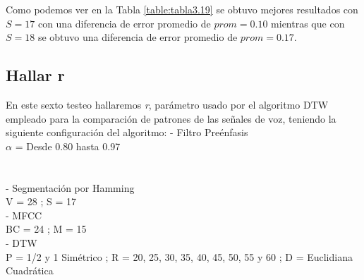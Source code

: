 Como podemos ver en la Tabla \ref{table:tabla3.19} se obtuvo mejores resultados con $S = 17$ con una diferencia de error promedio de $prom = 0.10$ mientras que con $S = 18$ se obtuvo una diferencia de error promedio de $prom = 0.17$.

\subsection{Hallar r}
En este sexto testeo hallaremos \textit{r}, parámetro usado por el algoritmo DTW empleado para la comparación de patrones de las señales de voz, teniendo la siguiente configuración del algoritmo:
\newpage
- Filtro Preénfasis \\
\hspace*{1cm} $\alpha$ = Desde 0.80 hasta 0.97 \\ \\ \\
- Segmentación por Hamming \\
\hspace*{1cm} V = 28 ; \qquad S = 17 \\
- MFCC \\
\hspace*{1cm} BC = 24 ; \qquad M = 15 \\
- DTW \\
\hspace*{1cm} P = 1/2 y 1 Simétrico ; R = 20, 25, 30, 35, 40, 45, 50, 55 y 60 ; D = Euclidiana Cuadrática

